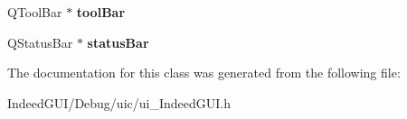 \begin{DoxyCompactItemize}
\item 
\hypertarget{class_ui___indeed_g_u_i_class_a6e327021682b9f13c869016cd012d7ca}{}Q\+Tool\+Bar $\ast$ {\bfseries tool\+Bar}\label{class_ui___indeed_g_u_i_class_a6e327021682b9f13c869016cd012d7ca}

\item 
\hypertarget{class_ui___indeed_g_u_i_class_a233004a78487c2f080aeeccfe1813142}{}Q\+Status\+Bar $\ast$ {\bfseries status\+Bar}\label{class_ui___indeed_g_u_i_class_a233004a78487c2f080aeeccfe1813142}

\end{DoxyCompactItemize}


The documentation for this class was generated from the following file\+:\begin{DoxyCompactItemize}
\item 
Indeed\+G\+U\+I/\+Debug/uic/ui\+\_\+\+Indeed\+G\+U\+I.\+h\end{DoxyCompactItemize}
